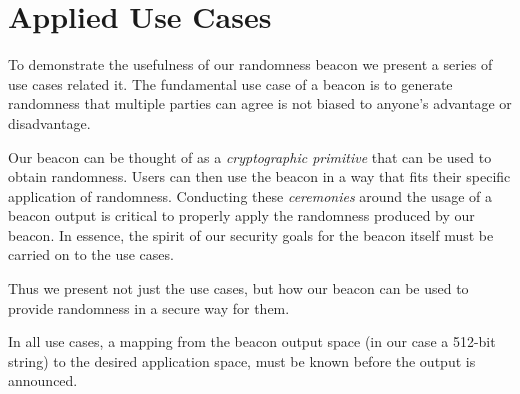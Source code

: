 \section{Applied Use Cases}
To demonstrate the usefulness of our randomness beacon we present a series of use cases related it.
The fundamental use case of a beacon is to generate randomness that multiple parties can agree is not biased to anyone's advantage or disadvantage.

Our beacon can be thought of as a \emph{cryptographic primitive} that can be used to obtain randomness. Users can then use the beacon in a way that fits their specific application of randomness. Conducting these \emph{ceremonies} around the usage of a beacon output is critical to properly apply the randomness produced by our beacon. In essence, the spirit of our security goals for the beacon itself must be carried on to the use cases.

Thus we present not just the use cases, but how our beacon can be used to provide randomness in a secure way for them.

In all use cases, a mapping from the beacon output space (in our case a 512-bit string) to the desired application space, must be known before the output is announced.